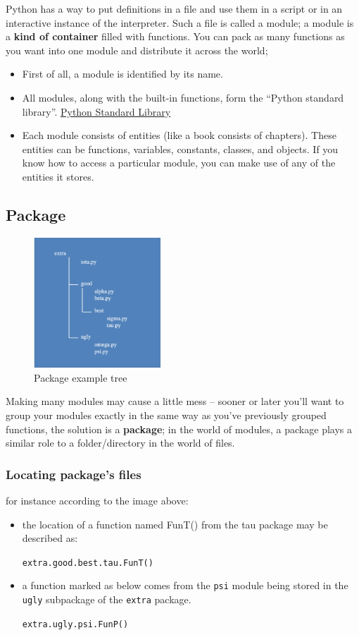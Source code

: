 \documentclass[11pt]{article}
\begin{document}
Python has a way to put definitions in a file and use them in a script
or in an interactive instance of the interpreter. Such a file is
called a module; a module is a \textbf{kind of container} filled with
functions. You can pack as many functions as you want into one module
and distribute it across the world;

\begin{itemize}
\item First of all, a module is identified by its name.
\item All modules, along with the built-in functions, form the
“Python standard library”. \href{https://docs.python.org/3/library/index.html}{Python Standard Library}
\item Each module consists of entities (like a book consists of
chapters). These entities can be functions, variables, constants,
classes, and objects. If you know how to access a particular module,
you can make use of any of the entities it stores.
\end{itemize}

\newpage
\subsection{Package}
\label{sec:orga1c8245}

\begin{figure}[htbp]
\centering
\includegraphics[width=180px]{./images/packageTree.png}
\caption{Package example tree}
\end{figure}

Making many modules may cause a little mess – sooner or
later you’ll want to group your modules exactly in the
same way as you’ve previously grouped functions, the
solution is a \textbf{package}; in the world of modules, a
package plays a similar role to a folder/directory in the
world of files.

\subsubsection{Locating package's files}
\label{sec:org8a26a8f}
for instance according to the image above:
\begin{itemize}
\item the location of a function named FunT() from the tau package may be
described as:

\texttt{extra.good.best.tau.FunT()}

\item a function marked as below comes from the \texttt{psi} module being stored in
the \texttt{ugly} subpackage of the \texttt{extra} package.

\texttt{extra.ugly.psi.FunP()}
\end{itemize}
\end{document}
